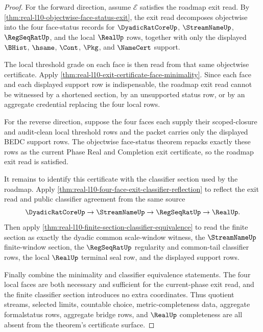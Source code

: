 \begin{proof}
For the forward direction, assume $\mathcal E$ satisfies the roadmap exit read. By \autoref{thm:real-l10-objectwise-face-status-exit}, the exit read decomposes objectwise into the four face-status records for $\DyadicRatCoreUp$, $\StreamNameUp$, $\RegSeqRatUp$, and the local $\RealUp$ rows, together with only the displayed $\BHist$, $\hsame$, $\Cont$, $\Pkg$, and $\NameCert$ support.

The local threshold grade on each face is then read from that same objectwise certificate. Apply \autoref{thm:real-l10-exit-certificate-face-minimality}. Since each face and each displayed support row is indispensable, the roadmap exit read cannot be witnessed by a shortened section, by an unsupported status row, or by an aggregate credential replacing the four local rows.

For the reverse direction, suppose the four faces each supply their scoped-closure and audit-clean local threshold rows and the packet carries only the displayed BEDC support rows. The objectwise face-status theorem repacks exactly these rows as the current Phase Real and Completion exit certificate, so the roadmap exit read is satisfied.

It remains to identify this certificate with the classifier section used by the roadmap. Apply \autoref{thm:real-l10-four-face-exit-classifier-reflection} to reflect the exit read and public classifier agreement from the same source
$$
\DyadicRatCoreUp \to \StreamNameUp \to \RegSeqRatUp \to \RealUp.
$$
Then apply \autoref{thm:real-l10-finite-section-classifier-equivalence} to read the finite section as exactly the dyadic common scale-window witness, the $\StreamNameUp$ finite-window section, the $\RegSeqRatUp$ regularity and common-tail classifier rows, the local $\RealUp$ terminal seal row, and the displayed support rows.

Finally combine the minimality and classifier equivalence statements. The four local faces are both necessary and sufficient for the current-phase exit read, and the finite classifier section introduces no extra coordinates. Thus quotient streams, selected limits, countable choice, metric-completeness data, aggregate formalstatus rows, aggregate bridge rows, and $\RealUp$ completeness are all absent from the theorem's certificate surface.
\end{proof}

